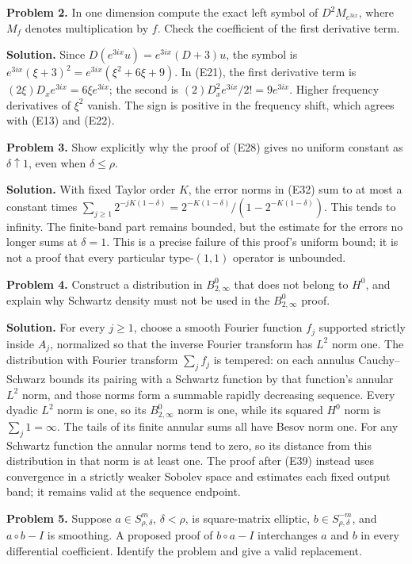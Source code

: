 \documentclass[
  11pt,
]{article}
\begin{document}
\textbf{Problem 2.} In one dimension compute the exact left symbol of
\(D^2 M_{e^{3ix}}\), where \(M_f\) denotes multiplication by \(f\).
Check the coefficient of the first derivative term.

\textbf{Solution.} Since \(D(e^{3ix}u)=e^{3ix}(D+3)u\), the symbol is
\(e^{3ix}(\xi+3)^2=e^{3ix}(\xi^2+6\xi+9)\). In (E21), the first
derivative term is \((2\xi)D_xe^{3ix}=6\xi e^{3ix}\); the second is
\((2)D_x^2e^{3ix}/2!=9e^{3ix}\). Higher frequency derivatives of
\(\xi^2\) vanish. The sign is positive in the frequency shift, which
agrees with (E13) and (E22).

\textbf{Problem 3.} Show explicitly why the proof of (E28) gives no
uniform constant as \(\delta\uparrow1\), even when \(\delta\leq\rho\).

\textbf{Solution.} With fixed Taylor order \(K\), the error norms in
(E32) sum to at most a constant times \(\sum_{j\geq1}2^{-jK(1-\delta)}
=2^{-K(1-\delta)}/(1-2^{-K(1-\delta)})\). This tends to infinity. The
finite-band part remains bounded, but the estimate for the errors no
longer sums at \(\delta=1\). This is a precise failure of this proof's
uniform bound; it is not a proof that every particular type-\((1,1)\)
operator is unbounded.

\textbf{Problem 4.} Construct a distribution in \(B^0_{2,\infty}\) that
does not belong to \(H^0\), and explain why Schwartz density must not be
used in the \(B^0_{2,\infty}\) proof.

\textbf{Solution.} For every \(j\geq1\), choose a smooth Fourier
function \(f_j\) supported strictly inside \(A_j\), normalized so that
the inverse Fourier transform has \(L^2\) norm one. The distribution
with Fourier transform \(\sum_jf_j\) is tempered: on each annulus
Cauchy--Schwarz bounds its pairing with a Schwartz function by that
function's annular \(L^2\) norm, and those norms form a summable rapidly
decreasing sequence. Every dyadic \(L^2\) norm is one, so its
\(B^0_{2,\infty}\) norm is one, while its squared \(H^0\) norm is
\(\sum_j1=\infty\). The tails of its finite annular sums all have Besov
norm one. For any Schwartz function the annular norms tend to zero, so
its distance from this distribution in that norm is at least one. The
proof after (E39) instead uses convergence in a strictly weaker Sobolev
space and estimates each fixed output band; it remains valid at the
sequence endpoint.

\textbf{Problem 5.} Suppose \(a\in S^m_{\rho,\delta}\), \(\delta<\rho\),
is square-matrix elliptic, \(b\in S^{-m}_{\rho,\delta}\), and
\(a\circ b-I\) is smoothing. A proposed proof of \(b\circ a-I\)
interchanges \(a\) and \(b\) in every differential coefficient. Identify
the problem and give a valid replacement.
\end{document}
